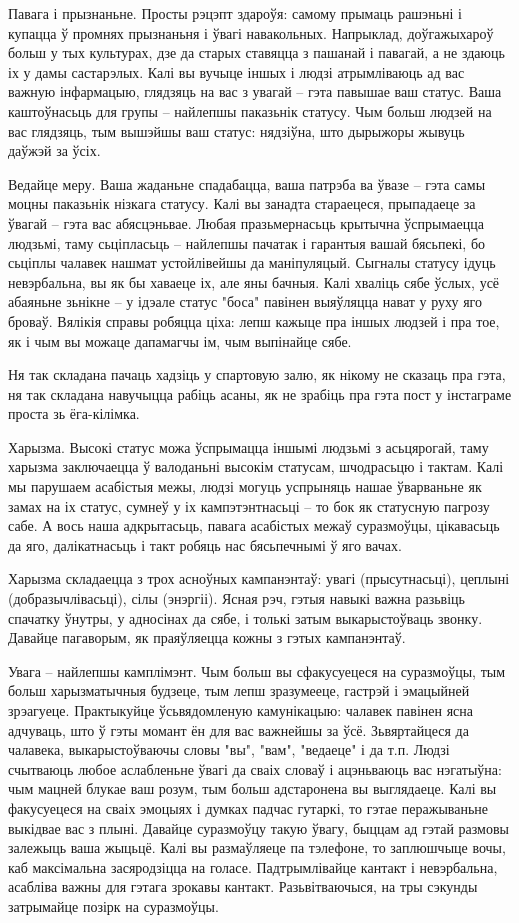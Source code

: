 Павага і прызнаньне. Просты рэцэпт здароўя: самому прымаць рашэньні і купацца ў промнях прызнаньня і ўвагі навакольных. Напрыклад, доўгажыхароў больш у тых культурах, дзе да старых ставяцца з пашанай і павагай, а не здаюць іх у дамы састарэлых. Калі вы вучыце іншых і людзі атрымліваюць ад вас важную інфармацыю, глядзяць на вас з увагай – гэта павышае ваш статус. Ваша каштоўнасьць для групы – найлепшы паказьнік статусу. Чым больш людзей на вас глядзяць, тым вышэйшы ваш статус: нядзіўна, што дырыжоры жывуць даўжэй за ўсіх.

Ведайце меру. Ваша жаданьне спадабацца, ваша патрэба ва ўвазе – гэта самы моцны паказьнік нізкага статусу. Калі вы занадта стараецеся, прыпадаеце за ўвагай – гэта вас абясцэньвае. Любая празьмернасьць крытычна ўспрымаецца людзьмі, таму сьціпласьць – найлепшы пачатак і гарантыя вашай бясьпекі, бо сьціплы чалавек нашмат устойлівейшы да маніпуляцый. Сыгналы статусу ідуць невэрбальна, вы як бы хаваеце іх, але яны бачныя. Калі хваліць сябе ўслых, усё абаяньне зьнікне – у ідэале статус "боса" павінен выяўляцца нават у руху яго броваў. Вялікія справы робяцца ціха: лепш кажыце пра іншых людзей і пра тое, як і чым вы можаце дапамагчы ім, чым выпінайце сябе.

Ня так складана пачаць хадзіць у спартовую залю, як нікому не сказаць пра гэта, ня так складана навучыцца рабіць асаны, як не зрабіць пра гэта пост у інстаграме проста зь ёга-кілімка.

Харызма. Высокі статус можа ўспрымацца іншымі людзьмі з асьцярогай, таму харызма заключаецца ў валоданьні высокім статусам, шчодрасьцю і тактам. Калі мы парушаем асабістыя межы, людзі могуць успрыняць нашае ўварваньне як замах на іх статус, сумнеў у іх кампэтэнтнасьці – то бок як статусную пагрозу сабе. А вось наша адкрытасьць, павага асабістых межаў суразмоўцы, цікавасьць да яго, далікатнасьць і такт робяць нас бясьпечнымі ў яго вачах.

Харызма складаецца з трох асноўных кампанэнтаў: увагі (прысутнасьці), цеплыні (добразычлівасьці), сілы (энэргіі). Ясная рэч, гэтыя навыкі важна разьвіць спачатку ўнутры, у адносінах да сябе, і толькі затым выкарыстоўваць звонку. Давайце пагаворым, як праяўляецца кожны з гэтых кампанэнтаў.

Увага – найлепшы камплімэнт. Чым больш вы сфакусуецеся на суразмоўцы, тым больш харызматычныя будзеце, тым лепш зразумееце, гастрэй і эмацыйней зрэагуеце. Практыкуйце ўсьвядомленую камунікацыю: чалавек павінен ясна адчуваць, што ў гэты момант ён для вас важнейшы за ўсё. Зьвяртайцеся да чалавека, выкарыстоўваючы словы "вы", "вам", "ведаеце" і да т.п. Людзі счытваюць любое аслабленьне ўвагі да сваіх словаў і ацэньваюць вас нэгатыўна: чым мацней блукае ваш розум, тым больш адстаронена вы выглядаеце. Калі вы факусуецеся на сваіх эмоцыях і думках падчас гутаркі, то гэтае перажываньне выкідвае вас з плыні. Давайце суразмоўцу такую ўвагу, быццам ад гэтай размовы залежыць ваша жыцьцё. Калі вы размаўляеце па тэлефоне, то заплюшчыце вочы, каб максімальна засяродзіцца на голасе. Падтрымлівайце кантакт і невэрбальна, асабліва важны для гэтага зрокавы кантакт. Разьвітваючыся, на тры сэкунды затрымайце позірк на суразмоўцы.

